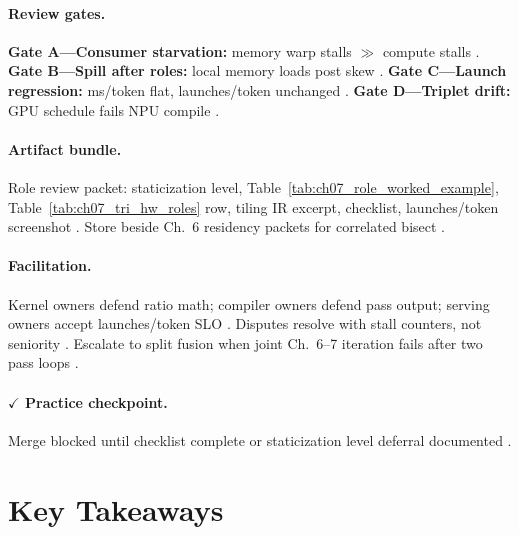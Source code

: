 \paragraph{Review gates.}
\textbf{Gate A---Consumer starvation:} memory warp stalls $\gg$ compute stalls \citep{shah2024flashattention3,yirage2026}.
\textbf{Gate B---Spill after roles:} local memory loads post skew \citep{memoryfloor2026,nvidia2022hopper}.
\textbf{Gate C---Launch regression:} ms/token flat, launches/token unchanged \citep{taxbreak2026,patel2025llminference}.
\textbf{Gate D---Triplet drift:} GPU schedule fails NPU compile \citep{amd2024xdna,yirage2026,chen2020compilerbasedhardw}.

\paragraph{Artifact bundle.}
Role review packet: staticization level, Table~\ref{tab:ch07_role_worked_example}, Table~\ref{tab:ch07_tri_hw_roles} row, tiling IR excerpt, checklist, launches/token screenshot \citep{yirage2026,taxbreak2026,shah2024flashattention3,patel2025llminference,chen2020compilerbasedhardw}.
Store beside Ch.~6 residency packets for correlated bisect \citep{dao2022flashattention,memoryfloor2026,mpk2025}.

\paragraph{Facilitation.}
Kernel owners defend ratio math; compiler owners defend pass output; serving owners accept launches/token SLO \citep{patel2025llminference,yirage2026,taxbreak2026}.
Disputes resolve with stall counters, not seniority \citep{shah2024flashattention3,chen2020compilerbasedhardw}.
Escalate to split fusion when joint Ch.~6--7 iteration fails after two pass loops \citep{wu2024mirage,yirage2026,mpk2025,memoryfloor2026}.

\paragraph{$\checkmark$ Practice checkpoint.}
Merge blocked until checklist complete or staticization level deferral documented \citep{yirage2026,chen2020compilerbasedhardw}.

\section{Key Takeaways}
\label{sec:ch07_key_takeaways}

